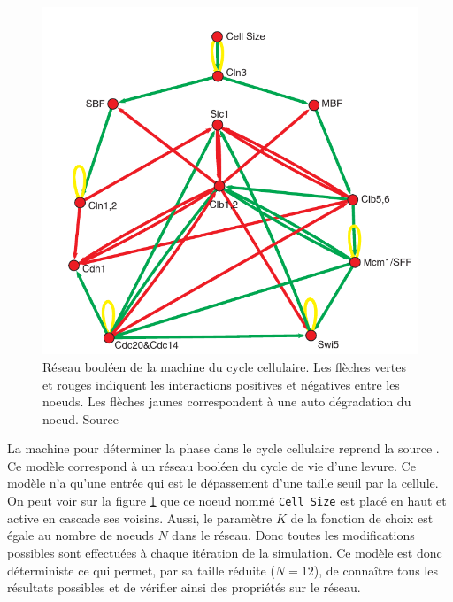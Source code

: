 \documentclass[11pt, a4paper]{article}
\begin{document}
\begin{figure}[position]
    \begin{center}
        \includegraphics[scale=0.335]{net_cycle}
        \caption{
            \label{net_cycle}
            Réseau booléen de la machine du cycle cellulaire. Les flèches
            vertes et rouges indiquent les interactions positives et négatives
            entre les noeuds. Les flèches jaunes correspondent à une auto
            dégradation du noeud.
            Source \cite{li2004}
        }
    \end{center}
\end{figure}

La machine  pour déterminer la phase dans le cycle cellulaire reprend la source
\cite{li2004}. Ce modèle correspond à un réseau booléen du cycle de vie d'une
levure. Ce modèle n'a qu'une entrée qui est le dépassement d'une taille seuil
par la cellule. On peut voir sur la figure \ref{net_cycle} que ce noeud nommé
\texttt{Cell Size} est placé en haut et active en cascade ses voisins. Aussi,
le paramètre $K$ de la fonction de choix est égale au nombre de noeuds $N$ dans
le réseau. Donc toutes les modifications possibles sont effectuées à chaque
itération de la simulation. Ce modèle est donc déterministe ce qui permet, par
sa taille réduite ($N = 12$), de connaître tous les résultats possibles et de
vérifier ainsi des propriétés sur le réseau.
\end{document}
